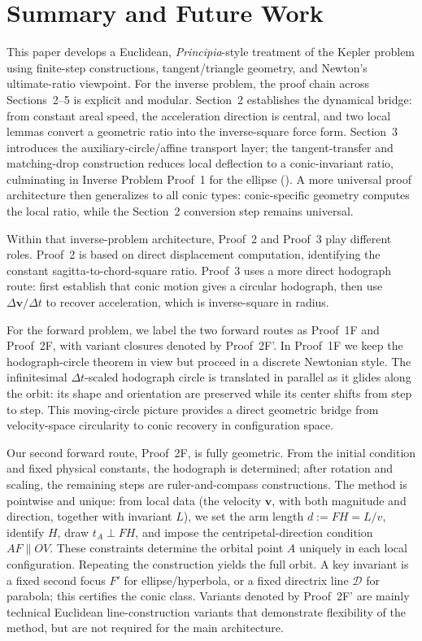 \section{Summary and Future Work}

This paper develops a Euclidean, \emph{Principia}-style treatment of the Kepler problem using finite-step constructions, tangent/triangle geometry, and Newton's ultimate-ratio viewpoint. For the inverse problem, the proof chain across Sections~2--5 is explicit and modular. Section~2 establishes the dynamical bridge: from constant areal speed, the acceleration direction is central, and two local lemmas convert a geometric ratio into the inverse-square force form. Section~3 introduces the auxiliary-circle/affine transport layer; the tangent-transfer and matching-drop construction reduces local deflection to a conic-invariant ratio, culminating in Inverse Problem Proof~1 for the ellipse (). A more universal proof architecture then generalizes to all conic types: conic-specific geometry computes the local ratio, while the Section~2 conversion step remains universal.

Within that inverse-problem architecture, Proof~2 and Proof~3 play different roles. Proof~2 is based on direct displacement computation, identifying the constant sagitta-to-chord-square ratio. Proof~3 uses a more direct hodograph route: first establish that conic motion gives a circular hodograph, then use \(\Delta \mathbf v/\Delta t\) to recover acceleration, which is inverse-square in radius.

For the forward problem, we label the two forward routes as Proof~1F and Proof~2F, with variant closures denoted by Proof~2F'. In Proof~1F we keep the hodograph-circle theorem in view but proceed in a discrete Newtonian style. The infinitesimal \(\Delta t\)-scaled hodograph circle is translated in parallel as it glides along the orbit: its shape and orientation are preserved while its center shifts from step to step. This moving-circle picture provides a direct geometric bridge from velocity-space circularity to conic recovery in configuration space. 

Our second forward route, Proof~2F, is fully geometric. From the initial condition and fixed physical constants, the hodograph is determined; after rotation and scaling, the remaining steps are ruler-and-compass constructions. The method is pointwise and unique: from local data (the velocity \(\mathbf v\), with both magnitude and direction, together with invariant \(L\)), we set the arm length \(d:=FH=L/v\), identify \(H\), draw \(t_A\perp FH\), and impose the centripetal-direction condition \(AF\parallel OV\). These constraints determine the orbital point \(A\) uniquely in each local configuration. Repeating the construction yields the full orbit. A key invariant is a fixed second focus \(F'\) for ellipse/hyperbola, or a fixed directrix line \(\mathcal D\) for parabola; this certifies the conic class. Variants denoted by Proof~2F' are mainly technical Euclidean line-construction variants that demonstrate flexibility of the method, but are not required for the main architecture.

